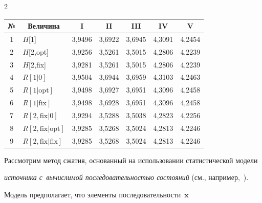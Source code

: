 \begin{multicols}{2}
\begin{table}
\begin{center}
\begin{tabular}{|c|l|c|c|c|c|c|}
№   & \multicolumn{1}{c|}{Величина}  & I          & II         & III        &   IV      & V \\

\hline

1   & $H$[1]      & 3,9496    & 3,6922    & 3,6945    & 4,3091    & 4,2454  \\

2   & $H$[2,opt]                    & 3,9256  & 3,5261  & 3,5015    & 4,2806    & 4,2239 \\

3   & $H$[2,fix]                            & 3,9281    & 3,5261    & 3,5015    & 4,2806    & 4,2239 \\

\hline

4   & $R[1\vert 0]$  & 3,9504    & 3,6944    & 3,6959    & 4,3103    & 4,2463 \\

5   & $R[1\vert \mathrm{opt}]$                    & 3,9498    & 3,6927    & 3,6951    & 4,3096    & 4,2458 \\

6   & $R[1\vert \mathrm{fix}]$                            & 3,9498    & 3,6928    & 3,6951    & 4,3096    & 4,2458 \\

7   & $R[2,\mathrm{fix}\vert 0] $                     & 3,9294    & 3,5288    & 3,5038    & 4,2823    & 4,2256 \\

8   & $R[2,\mathrm{fix}\vert \mathrm{opt}]$                & 3,9285    & 3,5268 & 3,5024   & 4,2813    & 4,2246 \\

9   & $R[2,\mathrm{fix}\vert \mathrm{fix}]$                    & 3,9285    & 3,5268 & 3,5024   & 4,2813    & 4,2246 \\

\hline

\end{tabular}

\end{center}

\end{table}



Рассмотрим метод сжатия, основанный на использовании статистической модели 

\textit{источника с~вычислимой последовательностью состояний} (см., например,~\cite{b4}). 

Модель предполагает, что элементы последовательности~$\mathbf{x}$ 


\end{multicols}
